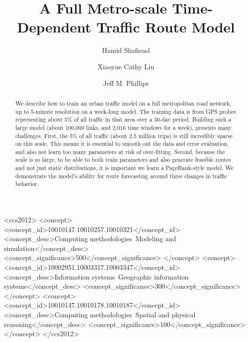 \documentclass[sigconf, review]{acmart}
\begin{document}
\title{A Full Metro-scale Time-Dependent Traffic Route Model}

\author{Hamid Shafieasl}
\author{Xiaoyue Cathy Liu}
\author{Jeff M. Phillips}



\renewcommand{\shortauthors}{Anonymous}

\begin{abstract}
We describe how to train an urban traffic model on a full metropolitan road network, up to 5-minute resolution on a week-long model.  The training data is from GPS probes representing about 5\% of all traffic in that area over a 30-day period.  Building such a large model (about 100,000 links, and 2,016 time windows for a week), presents many challenges.  First, the 5\% of all traffic (about 2.5 million trips) is still incredibly sparse on this scale.  This means it is essential to smooth out the data and error evaluation, and also not learn too many parameters at risk of over-fitting.  Second, because the scale is so large, to be able to both train parameters and also generate feasible routes and not just static distributions, it is important we learn a PageRank-style model.  We demonstrate the model's ability for route forecasting around three changes in traffic behavior.  
\end{abstract}

\begin{CCSXML}
<ccs2012>
  <concept>
    <concept_id>10010147.10010257.10010321</concept_id>
    <concept_desc>Computing methodologies~Modeling and simulation</concept_desc>
    <concept_significance>500</concept_significance>
  </concept>
  <concept>
    <concept_id>10002951.10003317.10003347</concept_id>
    <concept_desc>Information systems~Geographic information systems</concept_desc>
    <concept_significance>300</concept_significance>
  </concept>
  <concept>
    <concept_id>10010147.10010178.10010187</concept_id>
    <concept_desc>Computing methodologies~Spatial and physical reasoning</concept_desc>
    <concept_significance>100</concept_significance>
  </concept>
</ccs2012>
\end{CCSXML}
\end{document}
